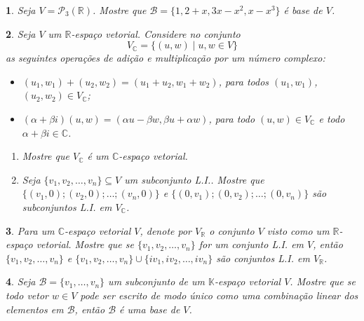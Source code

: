 \documentclass[12pt]{exam}
\newtheorem{exercicio}{}
\newcommand{\sub}{\subseteq}
\newcommand{\real}{\mathbb{R}}
\newcommand{\cp}[1]{\mathbb{#1}}
\begin{document}
\begin{exercicio}
  Seja $V = \mathcal{P}_3(\real)$. Mostre que $\mathcal{B} = \{1, 2+x, 3x-x^2,x-x^3\}$ \'e base de $V$.
\end{exercicio}

\begin{exercicio}
  Seja $V$ um $\real$-espa\c{c}o vetorial. Considere no conjunto
  \[
    V_\cp{C} = \{(u,w) \mid u, w \in V\}
  \]
  as seguintes opera\c{c}\~oes de adi\c{c}\~ao e multiplica\c{c}\~ao por um n\'umero complexo:
  \begin{itemize}
    \item $(u_1, w_1) + (u_2, w_2) = (u_1 + u_2, w_1 + w_2)$, para todos $(u_1, w_1)$, $(u_2, w_2) \in V_\cp{C}$;
    \item $(\alpha + \beta i)(u, w) = (\alpha u - \beta w, \beta u + \alpha w)$, para todo $(u, w) \in V_\cp{C}$ e todo $\alpha + \beta i \in \cp{C}$.
  \end{itemize}
  \begin{enumerate}[label={\alph*})]
    \item Mostre que $V_\cp{C}$ \'e um $\cp{C}$-espa\c{c}o vetorial.
    \item Seja $\{v_1, v_2, \dots, v_n\} \sub V$ um subconjunto L.I.. Mostre que $\{(v_1,0); (v_2,0); \dots; (v_n, 0)\}$ e $\{(0, v_1); (0, v_2); \dots; (0, v_n)\}$ s\~ao subconjuntos L.I. em $V_\cp{C}$.
  \end{enumerate}
\end{exercicio}

\begin{exercicio}
  Para um $\cp{C}$-espa\c{c}o vetorial $V$, denote por $V_\real$ o conjunto $V$ visto como um $\real$-espa\c{c}o  vetorial. Mostre que se $\{v_1, v_2, \dots, v_n\}$ for um conjunto L.I. em $V$, ent\~ao $\{v_1, v_2, \dots, v_n\}$ e $\{v_1, v_2, \dots, v_n\} \cup \{iv_1, iv_2, \dots, iv_n\}$ s\~ao conjuntos L.I. em $V_\real$.
\end{exercicio}

\begin{exercicio}
  Seja $\mathcal{B} = \{v_1, \ldots, v_n\}$ um subconjunto de um $\cp{K}$-espa\c{c}o vetorial $V$. Mostre que se todo vetor $w \in V$ pode ser escrito de modo \'unico como uma combina\c{c}\~ao linear dos elementos em $\mathcal{B}$, ent\~ao $\mathcal{B}$ \'e uma base de $V$.
\end{exercicio}











% 
\end{document}
